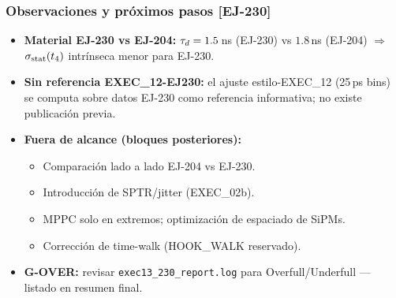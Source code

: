 \documentclass[aspectratio=169]{beamer}
\begin{document}
\begin{frame}
\frametitle{Observaciones y próximos pasos [EJ-230]}
\small
\begin{itemize}
  \item \textbf{Material EJ-230 vs EJ-204:} $\tau_d=1.5$\,ns (EJ-230) vs
        $1.8$\,ns (EJ-204) $\Rightarrow$ $\sigma_{\rm stat}(t_4)$ intrínseca menor para EJ-230.
  \item \textbf{Sin referencia EXEC\_12-EJ230:} el ajuste estilo-EXEC\_12 (25\,ps bins)
        se computa sobre datos EJ-230 como referencia informativa; no existe publicación previa.
  \item \textbf{Fuera de alcance (bloques posteriores):}
  \begin{itemize}\scriptsize
    \item Comparación lado a lado EJ-204 vs EJ-230.
    \item Introducción de SPTR/jitter (EXEC\_02b).
    \item MPPC solo en extremos; optimización de espaciado de SiPMs.
    \item Corrección de time-walk (HOOK\_WALK reservado).
  \end{itemize}
  \item \textbf{G-OVER:} revisar \texttt{exec13\_230\_report.log} para
        Overfull/Underfull --- listado en resumen final.
\end{itemize}

\end{frame}
\end{document}
